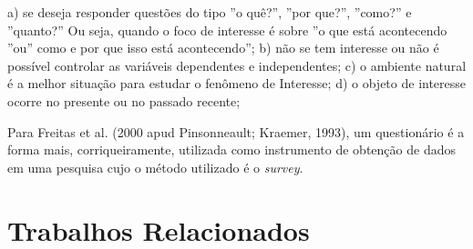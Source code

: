 \begin{flushright}
	\begin{minipage}{.96\textwidth}
		a) se deseja responder questões do tipo ”o quê?”, ”por que?”, ”como?” e ”quanto?” Ou seja, quando o foco de interesse é sobre ”o que está acontecendo ”ou” como e por que isso está acontecendo”;\newline		
		b) não se tem interesse ou não é possível controlar as variáveis dependentes e independentes;\newline
		c) o ambiente natural é a melhor situação para estudar o fenômeno de Interesse; \newline
		d) o objeto de interesse ocorre no presente ou no passado recente;
	\end{minipage}
\end{flushright}

\indent Para Freitas et al. (2000 apud Pinsonneault; Kraemer, 1993), um questionário é a forma mais, corriqueiramente, utilizada como instrumento de obtenção de dados em uma pesquisa cujo o método utilizado é o \textit{survey}.

\section{Trabalhos Relacionados} \label{Trabalhos Relacionados}

